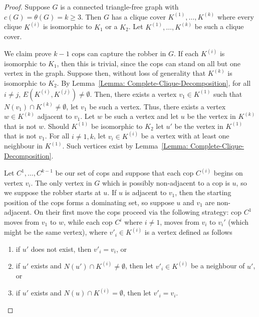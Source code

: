 \documentclass[12pt]{amsart}
\theoremstyle{definition}
\begin{document}
\begin{proof}
    Suppose $G$ is a connected triangle-free graph with $c(G) = \theta(G) = k\geq 3$.
    Then $G$ has a clique cover $K^{(1)}, \dots, K^{(k)}$ where every clique $K^{(i)}$ is isomorphic to $K_1$ or a $K_2$.
    Let  $K^{(1)}, \dots, K^{(k)}$ be such a clique cover.

    We claim prove $k-1$ cops can capture the robber in $G$.
    If each $K^{(i)}$ is isomorphic to $K_1$, then this is trivial, since the cops can stand on all but one vertex in the graph.
    Suppose then, without loss of generality that $K^{(k)}$ is isomorphic to $K_2$.
    By Lemma~\ref{Lemma: Complete-Clique-Decomposition}, for all $i\neq j$, $E(K^{(i)}, K^{(j)}) \neq \emptyset$.
    Then, there exists a vertex $v_1 \in K^{(1)}$ such that $N(v_1)\cap K^{(k)} \neq \emptyset$, let $v_1$ be such a vertex.
    Thus, there exists a vertex $w \in K^{(k)}$ adjacent to $v_1$.
    Let $w$ be such a vertex and let $u$ be the vertex in $K^{(k)}$ that is not $w$.
    Should $K^{(1)}$ be isomorphic to $K_2$ let $u'$ be the vertex in $K^{(1)}$ that is not $v_1$.
    For all $i\neq 1,k$, let $v_i \in K^{(i)}$ be a vertex with at least one neighbour in $K^{(1)}$.
    Such vertices exist by Lemma~\ref{Lemma: Complete-Clique-Decomposition}.
    
    Let $C^{1}, \dots, C^{k-1}$ be our set of cops
    and suppose that each cop $C^{(i)}$ begins on vertex $v_i$.
    The only vertex in $G$ which is possibly non-adjacent to a cop is $u$, so we suppose the robber starts at $u$.
    If $u$ is adjacent to $v_1$, then the starting position of the cops forms a dominating set, so suppose $u$ and $v_1$ are non-adjacent.
    On their first move the cops proceed via the following strategy:
    cop $C^{1}$ moves from $v_1$ to $w$, 
    while each cop $C^{i}$ where $i\neq 1$, moves from $v_i$ to $v_i'$ (which might be the same vertex),
    where $v'_i \in K^{(i)}$ 
    is a vertex defined as follows
    \begin{enumerate}
        \item if $u'$ does not exist, then $v'_i = v_i$, or
        \item if $u'$ exists and $N(u') \cap K^{(i)} \neq \emptyset$, then let $v'_i \in K^{(i)}$ be a neighbour of $u'$, or
        \item if $u'$ exists and $N(u) \cap K^{(i)} = \emptyset$, then let $v'_i = v_i$.
    \end{enumerate}
    

\end{proof}
\end{document}
